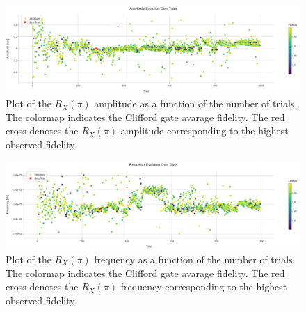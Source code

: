 \begin{figure}[h!]
    \centering
    \includegraphics[width=\textwidth]{figures/png/RB_optimization/Optuna/1000/amplitude.png}
    \caption{Plot of the $R_X(\pi)$ amplitude as a function of the number of trials.     
    The colormap indicates the Clifford gate avarage fidelity. 
     The red cross denotes the $R_X(\pi)$ amplitude corresponding to the highest observed fidelity.}
    \label{fig:optuna1000:amplitude}
\end{figure}

\begin{figure}[h!]
    \centering
    \includegraphics[width=\textwidth]{figures/png/RB_optimization/Optuna/1000/frequency.png}
    \caption{Plot of the $R_X(\pi)$ frequency as a function of the number of trials. 
    The colormap indicates the Clifford gate avarage fidelity.  
    The red cross denotes the $R_X(\pi)$ frequency corresponding to the highest observed fidelity.}
    \label{fig:optuna1000:frequency}
\end{figure}

